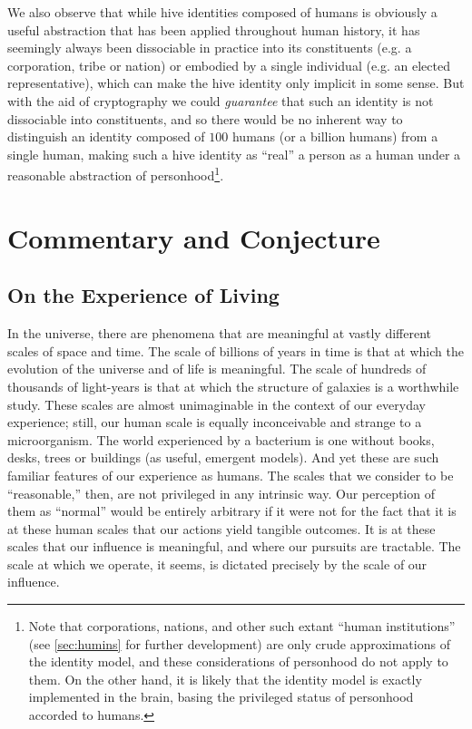 \documentclass[pra,twocolumn,groupedaddress,10pt]{revtex4}
\theoremstyle{definition}
\begin{document}
We also observe that while hive identities composed of humans is obviously a useful abstraction that has been applied throughout human history, it has seemingly always been dissociable in practice into its constituents (e.g. a corporation, tribe or nation) or embodied by a single individual (e.g. an elected representative), which can make the hive identity only implicit in some sense. But with the aid of cryptography we could \textit{guarantee} that such an identity is not dissociable into constituents, and so there would be no inherent way to distinguish an identity composed of $100$ humans (or a billion humans) from a single human, making such a hive identity as ``real'' a person as a human under a reasonable abstraction of personhood\footnote{Note that corporations, nations, and other such extant ``human institutions'' (see \autoref{sec:humins} for further development) are only crude approximations of the identity model, and these considerations of personhood do not apply to them. On the other hand, it is likely that the identity model is exactly implemented in the brain, basing the privileged status of personhood accorded to humans.}.

\section{Commentary and Conjecture} \label{sec:comcon}

\subsection{On the Experience of Living} \label{sec:expliv}

In the universe, there are phenomena that are meaningful at vastly different scales of space and time. The scale of billions of years in time is that at which the evolution of the universe and of life is meaningful. The scale of hundreds of thousands of light-years is that at which the structure of galaxies is a worthwhile study. These scales are almost unimaginable in the context of our everyday experience; still, our human scale is equally inconceivable and strange to a microorganism. The world experienced by a bacterium is one without books, desks, trees or buildings (as useful, emergent models). And yet these are such familiar features of our experience as humans. The scales that we consider to be ``reasonable,'' then, are not privileged in any intrinsic way. Our perception of them as ``normal'' would be entirely arbitrary if it were not for the fact that it is at these human scales that our actions yield tangible outcomes. It is at these scales that our influence is meaningful, and where our pursuits are tractable. The scale at which we operate, it seems, is dictated precisely by the scale of our influence.
\end{document}
